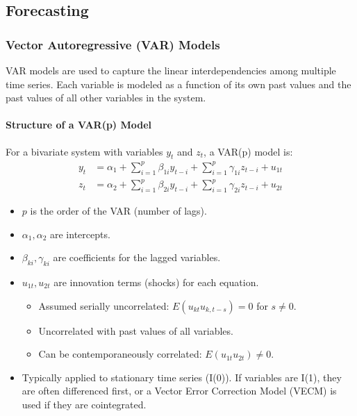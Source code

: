 \documentclass[a4paper, 10pt]{article}
\theoremstyle{definition}	%
\begin{document}
\subsection{Forecasting}

\subsubsection{Vector Autoregressive (VAR) Models}
VAR models are used to capture the linear interdependencies among multiple time series. Each variable is modeled as a function of its own past values and the past values of all other variables in the system.

\paragraph{Structure of a VAR(p) Model}
For a bivariate system with variables \(y_t\) and \(z_t\), a VAR(p) model is:
\begin{align}
y_t &= \alpha_1 + \sum_{i=1}^p \beta_{1i} y_{t-i} + \sum_{i=1}^p \gamma_{1i} z_{t-i} + u_{1t} \label{eq:var_y} \\
z_t &= \alpha_2 + \sum_{i=1}^p \beta_{2i} y_{t-i} + \sum_{i=1}^p \gamma_{2i} z_{t-i} + u_{2t} \label{eq:var_z}
\end{align}
\begin{itemize}
    \item \(p\) is the order of the VAR (number of lags).
    \item \(\alpha_1, \alpha_2\) are intercepts.
    \item \(\beta_{ki}, \gamma_{ki}\) are coefficients for the lagged variables.
    \item \(u_{1t}, u_{2t}\) are innovation terms (shocks) for each equation.
    \begin{itemize}
        \item Assumed serially uncorrelated: \(E(u_{kt} u_{k,t-s}) = 0\) for \(s \neq 0\).
        \item Uncorrelated with past values of all variables.
        \item Can be contemporaneously correlated: \(E(u_{1t} u_{2t}) \neq 0\).
    \end{itemize}
    \item Typically applied to stationary time series (I(0)). If variables are I(1), they are often differenced first, or a Vector Error Correction Model (VECM) is used if they are cointegrated.
\end{itemize}
\end{document}
